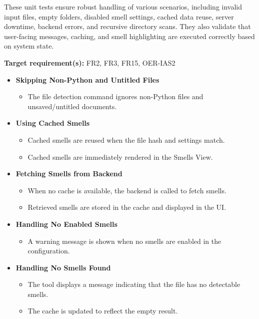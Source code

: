 \documentclass[12pt, titlepage]{article}
\begin{document}
\medskip

\noindent These unit tests ensure robust handling of various scenarios, including invalid input files, empty folders, disabled smell settings, cached data reuse, server downtime, backend errors, and recursive directory scans. They also validate that user-facing messages, caching, and smell highlighting are executed correctly based on system state.

\medskip

\noindent\textbf{Target requirement(s):} FR2, FR3, FR15, OER-IAS2~\cite{SRS} \\

\begin{itemize}
  \item \textbf{Skipping Non-Python and Untitled Files}
    \begin{itemize}
      \item The file detection command ignores non-Python files and unsaved/untitled documents.
    \end{itemize}

  \item \textbf{Using Cached Smells}
    \begin{itemize}
      \item Cached smells are reused when the file hash and settings match.
      \item Cached smells are immediately rendered in the Smells View.
    \end{itemize}

  \item \textbf{Fetching Smells from Backend}
    \begin{itemize}
      \item When no cache is available, the backend is called to fetch smells.
      \item Retrieved smells are stored in the cache and displayed in the UI.
    \end{itemize}

  \item \textbf{Handling No Enabled Smells}
    \begin{itemize}
      \item A warning message is shown when no smells are enabled in the configuration.
    \end{itemize}

  \item \textbf{Handling No Smells Found}
    \begin{itemize}
      \item The tool displays a message indicating that the file has no detectable smells.
      \item The cache is updated to reflect the empty result.
    \end{itemize}


\end{itemize}
\end{document}
